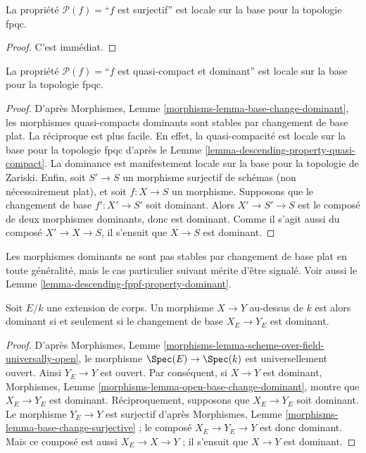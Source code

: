 \begin{lemma}
\label{lemma-descending-property-surjective}
La propriété $\mathcal{P}(f) =$``$f$ est surjectif'' est locale sur la base
pour la topologie fpqc.
\end{lemma}

\begin{proof}
C'est immédiat.
\end{proof}

\begin{lemma}
\label{lemma-descending-property-dominant}
La propriété $\mathcal{P}(f) =$``$f$ est quasi-compact et dominant'' est
locale sur la base pour la topologie fpqc.
\end{lemma}

\begin{proof}
D'après Morphismes, Lemme \ref{morphisms-lemma-base-change-dominant}, les
morphismes quasi-compacts dominants sont stables par changement de base plat.
La réciproque est plus facile. En effet, la quasi-compacité est locale sur la
base pour la topologie fpqc d'après le
Lemme \ref{lemma-descending-property-quasi-compact}. La dominance est
manifestement locale sur la base pour la topologie de Zariski. Enfin, soit
$S' \to S$ un morphisme surjectif de schémas (non nécessairement plat), et
soit $f : X \to S$ un morphisme. Supposons que le changement de base
$f' : X' \to S'$ soit dominant. Alors $X' \to S'\to S$ est le composé de
deux morphismes dominants, donc est dominant. Comme il s'agit aussi du composé
$X' \to X \to S$, il s'ensuit que $X\to S$ est dominant.
\end{proof}

\noindent
Les morphismes dominants ne sont pas stables par changement de base plat en
toute généralité, mais le cas particulier suivant mérite d'être signalé.
Voir aussi le Lemme \ref{lemma-descending-fppf-property-dominant}.

\begin{lemma}
\label{lemma-descending-property-dominant-over-field}
Soit $E/k$ une extension de corps. Un morphisme $X \to Y$ au-dessus de $k$
est alors dominant si et seulement si le changement de base $X_E \to Y_E$
est dominant.
\end{lemma}

\begin{proof}
D'après Morphismes, Lemme
\ref{morphisms-lemma-scheme-over-field-universally-open}, le morphisme
$\Spec(E) \to \Spec(k)$ est universellement ouvert. Ainsi $Y_E \to Y$ est
ouvert. Par conséquent, si $X \to Y$ est dominant, Morphismes, Lemme
\ref{morphisms-lemma-open-base-change-dominant}, montre que $X_E \to Y_E$
est dominant. Réciproquement, supposons que $X_E \to Y_E$ soit dominant.
Le morphisme $Y_E \to Y$ est surjectif d'après Morphismes, Lemme
\ref{morphisms-lemma-base-change-surjective} ; le composé
$X_E \to Y_E \to Y$ est donc dominant. Mais ce composé est aussi
$X_E \to X \to Y$ ; il s'ensuit que $X \to Y$ est dominant.
\end{proof}

